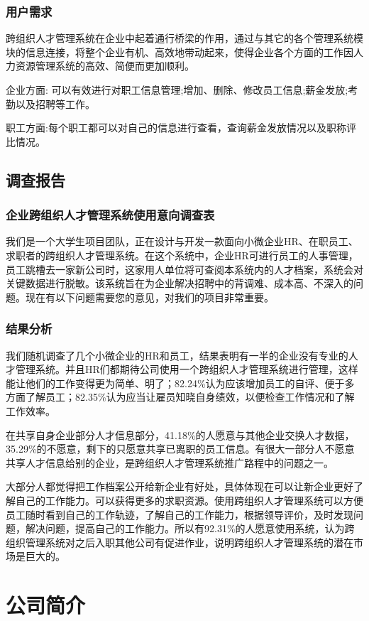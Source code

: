 \documentclass[UTF8]{ctexart}
\begin{document}
\subsubsection{用户需求}
跨组织人才管理系统在企业中起着通行桥梁的作用，通过与其它的各个管理系统模块的信息连接，将整个企业有机、高效地带动起来，使得企业各个方面的工作因人力资源管理系统的高效、简便而更加顺利。

企业方面: 可以有效进行对职工信息管理;增加、删除、修改员工信息;薪金发放;考勤以及招聘等工作。

职工方面:每个职工都可以对自己的信息进行查看，查询薪金发放情况以及职称评比情况。

\subsection{调查报告}
\subsubsection{企业跨组织人才管理系统使用意向调查表}
我们是一个大学生项目团队，正在设计与开发一款面向小微企业HR、在职员工、求职者的跨组织人才管理系统。在这个系统中，企业HR可进行员工的人事管理，员工跳槽去一家新公司时，这家用人单位将可查阅本系统内的人才档案，系统会对关键数据进行脱敏。该系统旨在为企业解决招聘中的背调难、成本高、不深入的问题。现在有以下问题需要您的意见，对我们的项目非常重要。
\subsubsection{结果分析}
我们随机调查了几个小微企业的HR和员工，结果表明有一半的企业没有专业的人才管理系统。并且HR们都期待公司使用一个跨组织人才管理系统进行管理，这样能让他们的工作变得更为简单、明了；82.24\%认为应该增加员工的自评、便于多方面了解员工；82.35\%认为应当让雇员知晓自身绩效，以便检查工作情况和了解工作效率。


在共享自身企业部分人才信息部分，41.18\%的人愿意与其他企业交换人才数据，35.29\%的不愿意，剩下的只愿意共享已离职的员工信息。有很大一部分人不愿意共享人才信息给别的企业，是跨组织人才管理系统推广路程中的问题之一。

大部分人都觉得把工作档案公开给新企业有好处，具体体现在可以让新企业更好了解自己的工作能力。可以获得更多的求职资源。使用跨组织人才管理系统可以方便员工随时看到自己的工作轨迹，了解自己的工作能力，根据领导评价，及时发现问题，解决问题，提高自己的工作能力。所以有92.31\%的人愿意使用系统，认为跨组织管理系统对之后入职其他公司有促进作业，说明跨组织人才管理系统的潜在市场是巨大的。

\section{公司简介}
\end{document}
